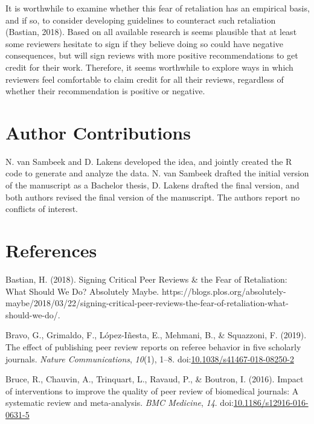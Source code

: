 \documentclass[,jou, a4paper,floatsintext]{apa6}
\begin{document}
It is worthwhile to examine whether this fear of retaliation has an empirical basis, and if so, to consider developing guidelines to counteract such retaliation (Bastian, 2018). Based on all available research is seems plausible that at least some reviewers hesitate to sign if they believe doing so could have negative consequences, but will sign reviews with more positive recommendations to get credit for their work. Therefore, it seems worthwhile to explore ways in which reviewers feel comfortable to claim credit for all their reviews, regardless of whether their recommendation is positive or negative.

\hypertarget{author-contributions}{%
\section{Author Contributions}\label{author-contributions}}

N. van Sambeek and D. Lakens developed the idea, and jointly created the R code to generate and analyze the data. N. van Sambeek drafted the initial version of the manuscript as a Bachelor thesis, D. Lakens drafted the final version, and both authors revised the final version of the manuscript. The authors report no conflicts of interest.

\hypertarget{references}{%
\section{References}\label{references}}

\setlength{\parindent}{-0.5in}
\setlength{\leftskip}{0.5in}

\hypertarget{refs}{}
\leavevmode\hypertarget{ref-bastian_signing_2018}{}%
Bastian, H. (2018). Signing Critical Peer Reviews \& the Fear of Retaliation: What Should We Do? \textbar{} Absolutely Maybe. https://blogs.plos.org/absolutely-maybe/2018/03/22/signing-critical-peer-reviews-the-fear-of-retaliation-what-should-we-do/.

\leavevmode\hypertarget{ref-bravo_effect_2019}{}%
Bravo, G., Grimaldo, F., López-Iñesta, E., Mehmani, B., \& Squazzoni, F. (2019). The effect of publishing peer review reports on referee behavior in five scholarly journals. \emph{Nature Communications}, \emph{10}(1), 1--8. doi:\href{https://doi.org/10.1038/s41467-018-08250-2}{10.1038/s41467-018-08250-2}

\leavevmode\hypertarget{ref-bruce_impact_2016}{}%
Bruce, R., Chauvin, A., Trinquart, L., Ravaud, P., \& Boutron, I. (2016). Impact of interventions to improve the quality of peer review of biomedical journals: A systematic review and meta-analysis. \emph{BMC Medicine}, \emph{14}. doi:\href{https://doi.org/10.1186/s12916-016-0631-5}{10.1186/s12916-016-0631-5}
\end{document}
